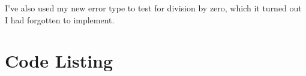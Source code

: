 \documentclass[a4paper,article,10pt,notitlepage,onecolumn,oneside]{memoir}
\begin{document}
\renewcommand\thecodefile{Test.hs}
\renewcommand\thecodedir{handin/tests/}


I've also used my new error type to test for division by zero, which it turned out I had
forgotten to implement.


\appendix

\section{Code Listing}






 

\end{document}
